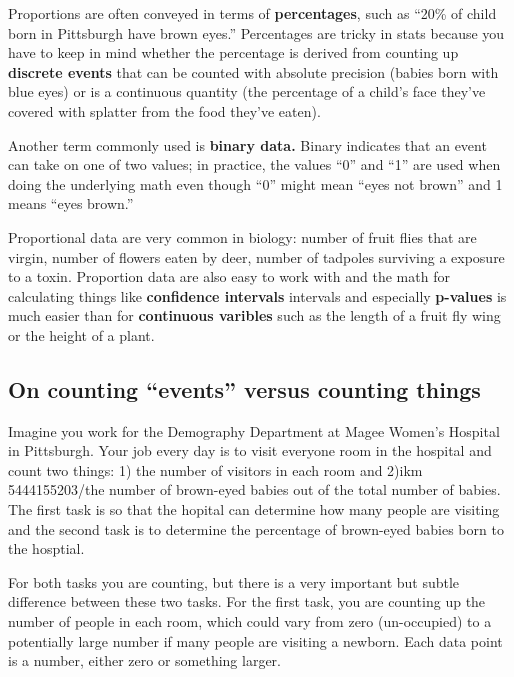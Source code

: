 \documentclass[]{book}
\theoremstyle{definition}
\theoremstyle{definition}
\theoremstyle{definition}
\theoremstyle{remark}
\begin{document}
Proportions are often conveyed in terms of \textbf{percentages}, such as
``20\% of child born in Pittsburgh have brown eyes.'' Percentages are
tricky in stats because you have to keep in mind whether the percentage
is derived from counting up \textbf{discrete events} that can be counted
with absolute precision (babies born with blue eyes) or is a continuous
quantity (the percentage of a child's face they've covered with splatter
from the food they've eaten).

Another term commonly used is \textbf{binary data.} Binary indicates
that an event can take on one of two values; in practice, the values
``0'' and ``1'' are used when doing the underlying math even though
``0'' might mean ``eyes not brown'' and 1 means ``eyes brown.''

Proportional data are very common in biology: number of fruit flies that
are virgin, number of flowers eaten by deer, number of tadpoles
surviving a exposure to a toxin. Proportion data are also easy to work
with and the math for calculating things like \textbf{confidence
intervals} intervals and especially \textbf{p-values} is much easier
than for \textbf{continuous varibles} such as the length of a fruit fly
wing or the height of a plant.

\subsection*{\texorpdfstring{On counting ``events'' versus counting
things}{On counting events versus counting things}}\label{on-counting-events-versus-counting-things}

Imagine you work for the Demography Department at Magee Women's Hospital
in Pittsburgh. Your job every day is to visit everyone room in the
hospital and count two things: 1) the number of visitors in each room
and 2)ikm 5444155203/the number of brown-eyed babies out of the total
number of babies. The first task is so that the hopital can determine
how many people are visiting and the second task is to determine the
percentage of brown-eyed babies born to the hosptial.

For both tasks you are counting, but there is a very important but
subtle difference between these two tasks. For the first task, you are
counting up the number of people in each room, which could vary from
zero (un-occupied) to a potentially large number if many people are
visiting a newborn. Each data point is a number, either zero or
something larger.
\end{document}
